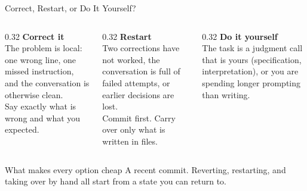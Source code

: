 \documentclass[aspectratio=169, 11pt]{beamer}
\begin{document}
\begin{frame}{Correct, Restart, or Do It Yourself?}
  \begin{columns}[T]
    \begin{column}{0.32\textwidth}
      \textbf{Correct it}\\[0.3em]
      {\small
      The problem is local: one wrong line, one missed instruction, and the conversation is otherwise clean.\\[0.3em]
      Say exactly what is wrong and what you expected.}
    \end{column}
    \begin{column}{0.32\textwidth}
      \textbf{Restart}\\[0.3em]
      {\small
      Two corrections have not worked, the conversation is full of failed attempts, or earlier decisions are lost.\\[0.3em]
      Commit first. Carry over only what is written in files.}
    \end{column}
    \begin{column}{0.32\textwidth}
      \textbf{Do it yourself}\\[0.3em]
      {\small
      The task is a judgment call that is yours (specification, interpretation), or you are spending longer prompting than writing.}
    \end{column}
  \end{columns}

  \vspace{0.8em}
  \begin{block}{What makes every option cheap}
    A recent commit. Reverting, restarting, and taking over by hand all start from a state you can return to.
  \end{block}
\end{frame}

\end{document}
